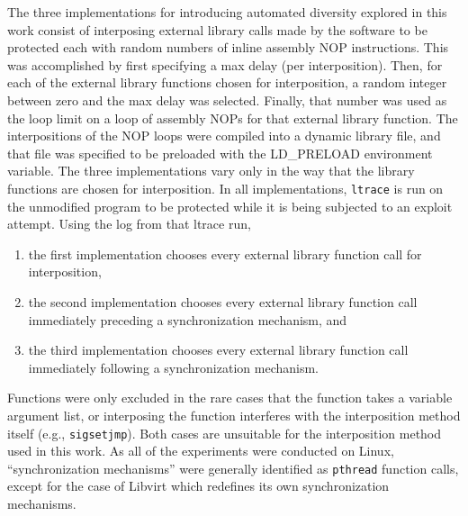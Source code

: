 The three implementations for introducing automated diversity explored in this work consist of interposing external library calls \cite{Conrad2009} made by the software to be protected each with random numbers of inline assembly NOP instructions.
This was accomplished by first specifying a max delay (per interposition).
Then, for each of the external library functions chosen for interposition, a random integer between zero and the max delay was selected.
Finally, that number was used as the loop limit on a loop of assembly NOPs for that external library function.
The interpositions of the NOP loops were compiled into a dynamic library file, and that file was specified to be preloaded with the LD\_PRELOAD environment variable.
The three implementations vary only in the way that the library functions are chosen for interposition.
In all implementations, \texttt{ltrace} \cite{cespedesltrace} is run on the unmodified program to be protected while it is being subjected to an exploit attempt.
Using the log from that ltrace run,
\begin{enumerate}
	\item the first implementation chooses every external library function call for interposition,
	\item the second implementation chooses every external library function call immediately preceding a synchronization mechanism, and
	\item the third implementation chooses every external library function call immediately following a synchronization mechanism.
\end{enumerate}
Functions were only excluded in the rare cases that the function takes a
variable argument list, or interposing the function interferes with the
interposition method itself (e.g., \texttt{sigsetjmp}).
Both cases are unsuitable for the interposition method used in this work.
As all of the experiments were conducted on Linux, ``synchronization
mechanisms'' were generally identified as \texttt{pthread} function calls, except for the case of Libvirt which redefines its own synchronization mechanisms.
